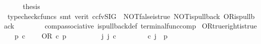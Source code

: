 \begin{isabellebody}
\ \ \isamarkupfalse%
\ \isamarkupfalse%
\ {\isacharquery}{\kern0pt}thesis\ \isanewline
\ \ \ \ \isamarkupfalse%
\ {\isacharparenleft}{\kern0pt}typecheck{\isacharunderscore}{\kern0pt}cfuncs{\isacharcomma}{\kern0pt}\ smt\ {\isacharparenleft}{\kern0pt}verit{\isacharcomma}{\kern0pt}\ ccfv{\isacharunderscore}{\kern0pt}SIG{\isacharparenright}{\kern0pt}\ \ NOT{\isacharunderscore}{\kern0pt}false{\isacharunderscore}{\kern0pt}is{\isacharunderscore}{\kern0pt}true\ NOT{\isacharunderscore}{\kern0pt}is{\isacharunderscore}{\kern0pt}pullback\ OR{\isacharunderscore}{\kern0pt}is{\isacharunderscore}{\kern0pt}pullback\isanewline
\ \ \ \ \ \ \ \ comp{\isacharunderscore}{\kern0pt}associative{}\ is{\isacharunderscore}{\kern0pt}pullback{\isacharunderscore}{\kern0pt}def\ terminal{\isacharunderscore}{\kern0pt}func{\isacharunderscore}{\kern0pt}comp{\isacharparenright}{\kern0pt}\isanewline
{}\isamarkupfalse%
%
\endisatagproof
{\isafoldproof}%
%
\isadelimproof
\isanewline
%
\endisadelimproof
\isanewline
{}\isamarkupfalse%
\ OR{\isacharunderscore}{\kern0pt}true{\isacharunderscore}{\kern0pt}right{\isacharunderscore}{\kern0pt}is{\isacharunderscore}{\kern0pt}true{\isacharcolon}{\kern0pt}\isanewline
\ \ \ {\isachardoublequoteopen}p\ {\isasymin}\isactrlsub c\ {\isasymOmega}{\isachardoublequoteclose}\isanewline
\ \ \ {\isachardoublequoteopen}OR\ {\isasymcirc}\isactrlsub c\ {\isasymlangle}p{\isacharcomma}{\kern0pt}{\isasymt}{\isasymrangle}\ {\isacharequal}{\kern0pt}\ {\isasymt}{\isachardoublequoteclose}\isanewline
%
\isadelimproof
%
\endisadelimproof
%
\isatagproof
{}\isamarkupfalse%
\ {\isacharminus}{\kern0pt}\ \isanewline
\ \ \isamarkupfalse%
\ {\isachardoublequoteopen}{\isasymexists}\ j{\isachardot}{\kern0pt}\ j\ {\isasymin}\isactrlsub c\ {\isasymone}{\isasymCoprod}{\isacharparenleft}{\kern0pt}{\isasymone}{\isasymCoprod}{\isasymone}{\isacharparenright}{\kern0pt}\ {\isasymand}\ {\isacharparenleft}{\kern0pt}{\isasymlangle}{\isasymt}{\isacharcomma}{\kern0pt}\ {\isasymt}{\isasymrangle}{\isasymamalg}\ {\isacharparenleft}{\kern0pt}{\isasymlangle}{\isasymt}{\isacharcomma}{\kern0pt}\ {\isasymf}{\isasymrangle}\ {\isasymamalg}{\isasymlangle}{\isasymf}{\isacharcomma}{\kern0pt}\ {\isasymt}{\isasymrangle}{\isacharparenright}{\kern0pt}{\isacharparenright}{\kern0pt}\ {\isasymcirc}\isactrlsub c\ j\ {\isacharequal}{\kern0pt}\ {\isasymlangle}p{\isacharcomma}{\kern0pt}{\isasymt}{\isasymrangle}{\isachardoublequoteclose}\isanewline
\ \ \ \ \isamarkupfalse%

\end{isabellebody}

